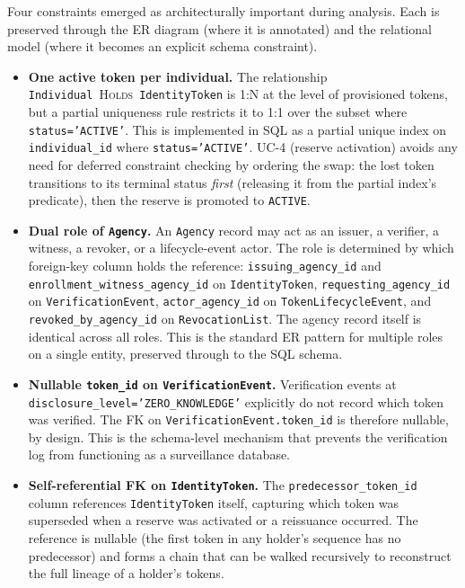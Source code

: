 \documentclass[11pt,letterpaper]{article}
\newcommand{\entity}[1]{\texttt{\color{navydark}#1}}
\begin{document}
Four constraints emerged as architecturally important during analysis. Each is preserved through the ER diagram (where it is annotated) and the relational model (where it becomes an explicit schema constraint).

\begin{itemize}
  \item \textbf{One active token per individual.} The relationship \entity{Individual}~\textsc{Holds}~\entity{IdentityToken} is 1:N at the level of provisioned tokens, but a partial uniqueness rule restricts it to 1:1 over the subset where \texttt{status='ACTIVE'}. This is implemented in SQL as a partial unique index on \texttt{individual\_id} where \texttt{status='ACTIVE'}. UC-4 (reserve activation) avoids any need for deferred constraint checking by ordering the swap: the lost token transitions to its terminal status \textit{first} (releasing it from the partial index's predicate), then the reserve is promoted to \texttt{ACTIVE}.
  \item \textbf{Dual role of \entity{Agency}.} An \entity{Agency} record may act as an issuer, a verifier, a witness, a revoker, or a lifecycle-event actor. The role is determined by which foreign-key column holds the reference: \texttt{issuing\_agency\_id} and \texttt{enrollment\_witness\_agency\_id} on \entity{IdentityToken}, \texttt{requesting\_agency\_id} on \entity{VerificationEvent}, \texttt{actor\_agency\_id} on \entity{TokenLifecycleEvent}, and \texttt{revoked\_by\_agency\_id} on \entity{RevocationList}. The agency record itself is identical across all roles. This is the standard ER pattern for multiple roles on a single entity, preserved through to the SQL schema.
  \item \textbf{Nullable \texttt{token\_id} on \entity{VerificationEvent}.} Verification events at \texttt{disclosure\_level='ZERO\_KNOWLEDGE'} explicitly do not record which token was verified. The FK on \texttt{VerificationEvent.token\_id} is therefore nullable, by design. This is the schema-level mechanism that prevents the verification log from functioning as a surveillance database.
  \item \textbf{Self-referential FK on \entity{IdentityToken}.} The \texttt{predecessor\_token\_id} column references \entity{IdentityToken} itself, capturing which token was superseded when a reserve was activated or a reissuance occurred. The reference is nullable (the first token in any holder's sequence has no predecessor) and forms a chain that can be walked recursively to reconstruct the full lineage of a holder's tokens.
\end{itemize}
\end{document}
